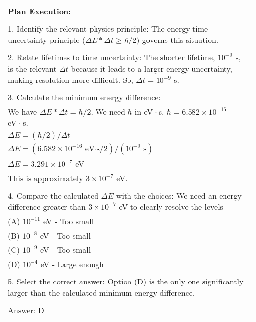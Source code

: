 \begin{table*}
\begin{tabular}{p{\linewidth}}
\textbf{Plan Execution:}\\ \\ 1. Identify the relevant physics principle: The energy-time uncertainty principle ($\Delta E * \Delta t \geq \hbar/2$) governs this situation.\\ \\ 2. Relate lifetimes to time uncertainty: The shorter lifetime, $10^{-9}$ s, is the relevant $\Delta t$ because it leads to a larger energy uncertainty, making resolution more difficult. So, $\Delta t = 10^{-9}$ s.\\ \\ 3. Calculate the minimum energy difference:\\ We have $\Delta E * \Delta t = \hbar/2$. We need $\hbar$ in eV·s. $\hbar = 6.582 \times 10^{-16}$ eV·s.\\ $\Delta E = (\hbar/2) / \Delta t$\\ $\Delta E = (6.582 \times 10^{-16} \text{ eV·s} / 2) / (10^{-9} \text{ s})$\\ $\Delta E = 3.291 \times 10^{-7}$ eV\\ This is approximately $3 \times 10^{-7}$ eV.\\ \\ 4. Compare the calculated $\Delta E$ with the choices: We need an energy difference greater than $3 \times 10^{-7}$ eV to clearly resolve the levels.\\ (A) $10^{-11}$ eV - Too small\\ (B) $10^{-8}$ eV - Too small\\ (C) $10^{-9}$ eV - Too small\\ (D) $10^{-4}$ eV - Large enough\\ \\ 5. Select the correct answer: Option (D) is the only one significantly larger than the calculated minimum energy difference.\\ \\ Answer: D \\ \bottomrule
\end{tabular}
\caption{Examples of generated plans by \plangen{} (Best of $\mathcal{N}$) given physics problem. The example illustrates the plan generation and it's execution for physics problem from GPQA}
\label{tab:gpqa_example}
\end{table*}